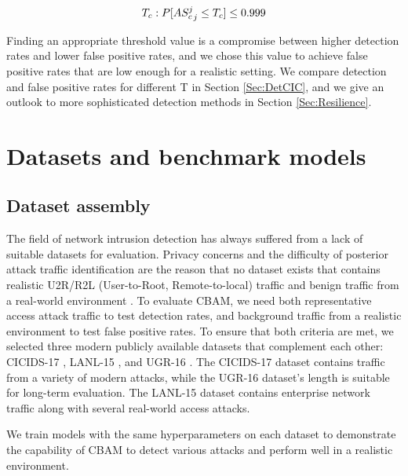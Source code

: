 \begin{align*}
T_{c}:P\Large[\large{AS_{c}^j\large}_j \leq T_c  \Large] \leq 0.999
\end{align*}

Finding an appropriate threshold value is a compromise between higher detection rates and lower false positive rates, and we chose this value to achieve false positive rates that are low enough for a realistic setting. We compare detection and false positive rates for different T in Section \ref{Sec:DetCIC}, and we give an outlook to more sophisticated detection methods in Section \ref{Sec:Resilience}.



\section{Datasets and benchmark models}\label{Sec:Datasets}

\subsection{Dataset assembly}\label{Sec:data}

The field of network intrusion detection has always suffered from a lack of suitable datasets for evaluation. Privacy concerns and the difficulty of posterior attack traffic identification are the reason that no dataset exists that contains realistic U2R/R2L (User-to-Root, Remote-to-local) traffic and benign traffic from a real-world environment \cite{ahmed2016survey}. 
To evaluate CBAM, we need both representative access attack traffic to test detection rates, and  background traffic from a realistic environment to test false positive rates. To ensure that both criteria are met, we selected three modern publicly available datasets that complement each other: CICIDS-17 \cite{sharafaldin2018toward}, LANL-15 \cite{akent-2015-enterprise-data,kent-2015-cyberdata1}, and UGR-16 \cite{macia2018ugr}. 
 The CICIDS-17 dataset contains traffic from a variety of modern attacks, while the UGR-16 dataset's length is suitable for long-term evaluation. The LANL-15 dataset contains enterprise network traffic along with several real-world access attacks.
 
 We train models with the same hyperparameters on each dataset to demonstrate the capability of CBAM to detect various attacks and perform well in a realistic environment. 



